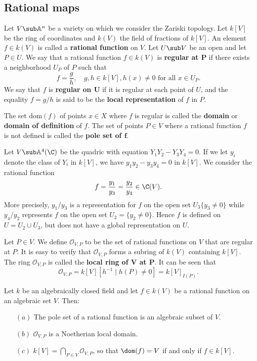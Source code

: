 \subsection{Rational maps}
Let $V\sub\mathbb{A}^n$ be a variety on which we consider the Zariski topology. Let $k[V]$ be the ring of coordinates and $k(V)$ the field of fractions of $k[V]$. An element $f\in k(V)$ is called a \textbf{rational function} on $V$. Let $U\sub V$ be an open and let $P\in U$. We say that a rational function $f\in k(V)$ is \textbf{regular at $\bm{P}$} if there exists a neighborhood $U_P$ of $P$ such that
\[f=\frac{g}{h},\quad g,h\in k[V],h(x)\neq 0\text{ for all $x\in U_P$}.\]
We say that $f$ is \textbf{regular on $\bm{U}$} if it is regular at each point of $U$, and the equality $f=g/h$ is said to be the \textbf{local representation} of $f$ in $P$.\par
The set $\mathrm{dom}(f)$ of points $x\in X$ where $f$ is regular is called the \textbf{domain} or \textbf{domain of definition} of $f$. The set of points $P\in V$ where a rational function $f$ is not defined is called the \textbf{pole set of $\bm{f}$}.
\begin{example}
Let $V\sub\mathbb{A}^4(\C)$ be the quadric with equation $Y_1Y_2-Y_3Y_4=0$. If we let $y_i$ denote the class of $Y_i$ in $k[V]$, we have $y_1y_2-y_3y_4=0$ in $k[V]$. We consider the rational function
\[f=\frac{y_1}{y_3}=\frac{y_2}{y_4}\in\C(V).\]
More precisely, $y_1/y_3$ is a representation for $f$ on the open set $U_3\{y_3\neq 0\}$ while $y_4/y_2$ represents $f$ on the open set $U_2=\{y_2\neq 0\}$. Hence $f$ is defined on $U=U_2\cup U_3$, but does not have a global representation on $U$.
\end{example}
Let $P\in V$. We define $\mathscr{O}_{V,P}$ to be the set of rational functions on $V$ that are regular at $P$. It is easy to verify that $\mathscr{O}_{V,P}$ forms a subring of $k(V)$ containing $k[V]$. The ring $\mathscr{O}_{V,P}$ is called the \textbf{local ring of $\bm{V}$ at $\bm{P}$}. It can be seen that
\[\mathscr{O}_{V,P}=k[V][h^{-1}\mid h(P)\neq 0]=k[V]_{I(P)}.\]
\begin{lemma}
Let $k$ be an algebraically closed field and let $f\in k(V)$ be a rational function on an algebraic set $V$. Then:
\begin{itemize}
\item[$(a)$] The pole set of a rational function is an algebraic subset of $V$.
\item[$(b)$] $\mathscr{O}_{V,P}$ is a Noetherian local domain.
\item[$(c)$] $k[V]=\bigcap_{P\in V}\mathscr{O}_{V,P}$, so that $\dom(f)=V$ if and only if $f\in k[V]$.
\end{itemize}
\end{lemma}

